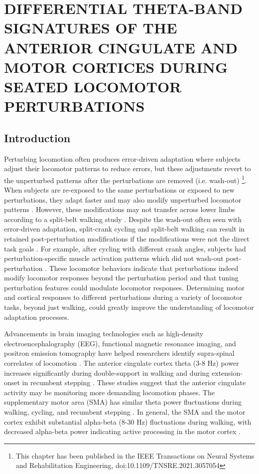 \documentclass[../thesis_seyed.tex]{subfiles}
\begin{document}
\chapter{DIFFERENTIAL THETA-BAND SIGNATURES OF THE ANTERIOR CINGULATE AND MOTOR CORTICES DURING SEATED LOCOMOTOR PERTURBATIONS}
\section{Introduction}
\label{sec:introduction}
Perturbing locomotion often produces error-driven adaptation where subjects adjust their locomotor patterns to reduce errors, but these adjustments revert to the unperturbed patterns after the perturbations are removed (i.e. wash-out) \cite{Torres-Oviedo2011-tv} \footnote{This chapter has been published in the IEEE Transactions on Neural Systems and Rehabilitation Engineering, doi:10.1109/TNSRE.2021.3057054}. {When subjects are re-exposed to the same perturbations or exposed to new perturbations, they adapt faster and may also modify unperturbed locomotor patterns} \cite{Leech2018-sr}. {However, these modifications may not transfer across lower limbs according to a split-belt walking study} \cite{Choi2007-pc}. {Despite the wash-out often seen with error-driven adaptation, split-crank cycling and split-belt walking can result in retained post-perturbation modifications if the modifications were not the direct task goals} \cite{Alibiglou2011-sc,Maclellan2014-vk}. For example, after cycling with different crank angles, subjects had perturbation-specific muscle activation patterns which did not wash-out post-perturbation \cite{Alibiglou2011-sc}. These locomotor behaviors indicate that perturbations indeed modify locomotor responses beyond the perturbation period and that tuning perturbation features could modulate locomotor responses. Determining motor and cortical responses to different perturbations during a variety of locomotor tasks, beyond just walking, could greatly improve the understanding of locomotor adaptation processes.

Advancements in brain imaging technologies such as high-density electroencephalography (EEG), functional magnetic resonance imaging, and positron emission tomography have helped researchers identify supra-spinal correlates of locomotion \cite{Gramann2011-yj,Enders2016-id,Hinton2019-gg}. The anterior cingulate cortex theta (3-8 Hz) power increases significantly during double-support in walking and during extension-onset in recumbent stepping \cite{Bulea2015-dv,Kline2016-ci}. These studies suggest that the anterior cingulate activity may be monitoring more demanding locomotion phases. The supplementary motor area (SMA) has similar theta power fluctuations during walking, cycling, and recumbent stepping \cite{Gramann2011-yj,Jaeger2014-ao,Kline2016-ci}. In general, the SMA and the motor cortex exhibit substantial alpha-beta (8-30 Hz) fluctuations during walking, with decreased alpha-beta power indicating active processing in the motor cortex \cite{Nordin2019-gd}.
\end{document}
